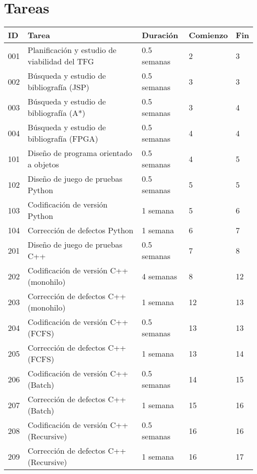 \pagebreak
\section{Tareas}

\begin{center}
    \begin{table}[h]
        \centering
        \begin{tabular}{ l | l l l l }
            \hline
            ID & Tarea & Duración & Comienzo & Fin \\
            \hline
            001 & Planificación y estudio de viabilidad del TFG & 0.5 semanas & 2 & 3 \\
            002 & Búsqueda y estudio de bibliografía (JSP) & 0.5 semanas & 3 & 3 \\
            003 & Búsqueda y estudio de bibliografía (A*) & 0.5 semanas & 3 & 4 \\
            004 & Búsqueda y estudio de bibliografía (FPGA) & 0.5 semanas & 4 & 4 \\
            \hline
            101 & Diseño de programa orientado a objetos & 0.5 semanas & 4 & 5 \\
            102 & Diseño de juego de pruebas Python & 0.5 semanas & 5 & 5 \\
            103 & Codificación de versión Python & 1 semana & 5 & 6 \\
            104 & Corrección de defectos Python & 1 semana & 6 & 7 \\
            \hline
            201 & Diseño de juego de pruebas C++ & 0.5 semanas & 7 & 8 \\
            202 & Codificación de versión C++ (monohilo) & 4 semanas & 8 & 12 \\
            203 & Corrección de defectos C++ (monohilo) & 1 semana & 12 & 13 \\
            204 & Codificación de versión C++ (FCFS) & 0.5 semanas & 13 & 13 \\
            205 & Corrección de defectos C++ (FCFS) & 1 semana & 13 & 14 \\
            206 & Codificación de versión C++ (Batch) & 0.5 semanas & 14 & 15 \\
            207 & Corrección de defectos C++ (Batch) & 1 semana & 15 & 16 \\
            208 & Codificación de versión C++ (Recursive) & 0.5 semanas & 16 & 16 \\
            209 & Corrección de defectos C++ (Recursive) & 1 semana & 16 & 17 \\

\end{tabular}
\end{table}
\end{center}
